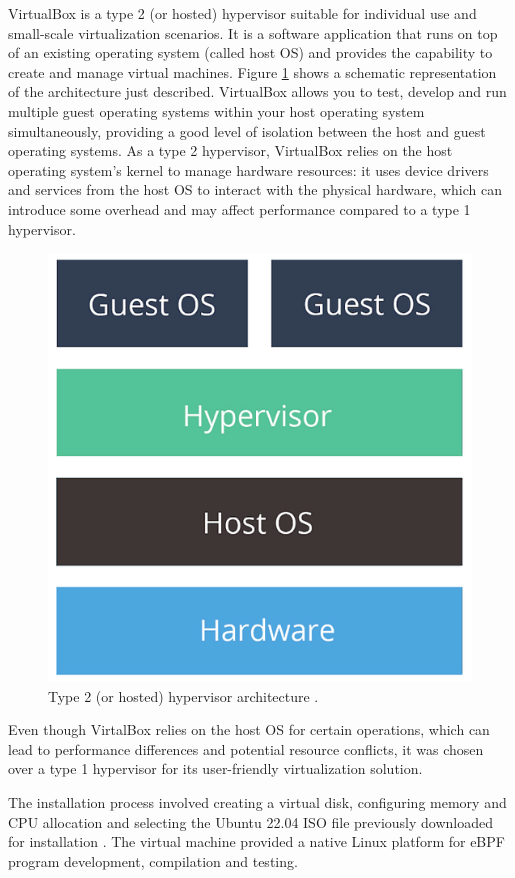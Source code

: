 VirtualBox is a type 2 (or hosted) hypervisor suitable for individual use and small-scale virtualization scenarios.
It is a software application that runs on top of an existing operating system (called host OS) and provides the capability to create and manage virtual machines. 
Figure \ref{fig:type_2_hypervisor} shows a schematic representation of the architecture just described.
VirtualBox allows you to test, develop and run multiple guest operating systems within your host operating system simultaneously, providing a good level of isolation between the host and guest operating systems.
As a type 2 hypervisor, VirtualBox relies on the host operating system's kernel to manage hardware resources: it uses device drivers and services from the host OS to interact with the physical hardware, which can introduce some overhead and may affect performance compared to a type 1 hypervisor.

\begin{figure}[h]
	\centering
	\includegraphics[width=0.7\linewidth]{images/Technologies/type_2_hypervisor.png}
	\caption{Type 2 (or hosted) hypervisor architecture \cite{HypervisorsArchitectures}.}
	\label{fig:type_2_hypervisor}
\end{figure}

Even though VirtalBox relies on the host OS for certain operations, which can lead to performance differences and potential resource conflicts, it was chosen over a type 1 hypervisor for its user-friendly virtualization solution.

The installation process involved creating a virtual disk, configuring memory and CPU allocation and selecting the Ubuntu 22.04 ISO file previously downloaded for installation \cite{UbuntuISOImage}. 
The virtual machine provided a native Linux platform for eBPF program development, compilation and testing.

